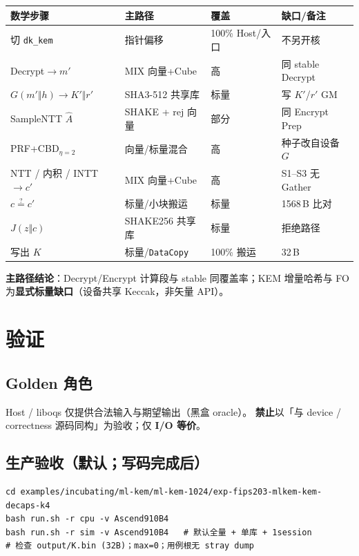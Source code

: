 \documentclass[UTF8,a4paper,11pt]{ctexart}
\begin{document}
\begin{longtable}{@{}L{3.8cm}L{3.6cm}L{1.4cm}L{4.0cm}@{}}
\toprule
数学步骤 & 主路径 & 覆盖 & 缺口/备注 \\
\midrule
切 \texttt{dk\_kem} & 指针偏移 & 100\% Host/入口 & 不另开核 \\
Decrypt$\to m'$ & MIX 向量+Cube & 高 & 同 stable Decrypt \\
$G(m'\Vert h)\to K'\Vert r'$ & SHA3-512 共享库 & 标量 & 写 $K'$/$r'$ GM \\
SampleNTT $\hat{A}$ & SHAKE + rej 向量 & 部分 & 同 Encrypt Prep \\
PRF+CBD$_{\eta=2}$ & 向量/标量混合 & 高 & 种子改自设备 $G$ \\
NTT / 内积 / INTT$\to c'$ & MIX 向量+Cube & 高 & S1--S3 无 Gather \\
$c\stackrel{?}{=}c'$ & 标量/小块搬运 & 标量 & 1568\,B 比对 \\
$J(z\Vert c)$ & SHAKE256 共享库 & 标量 & 拒绝路径 \\
写出 $K$ & 标量/\texttt{DataCopy} & 100\% 搬运 & 32\,B \\
\bottomrule
\end{longtable}

\textbf{主路径结论}：Decrypt/Encrypt 计算段与 stable 同覆盖率；KEM 增量哈希与 FO
为\textbf{显式标量缺口}（设备共享 Keccak，非矢量 API）。

\section{验证}
\label{sec:verify}

\subsection{Golden 角色}

Host / liboqs 仅提供合法输入与期望输出（黑盒 oracle）。
\textbf{禁止}以「与 device / correctness 源码同构」为验收；仅 \textbf{I/O 等价}。

\subsection{生产验收（默认；写码完成后）}

\begin{verbatim}
cd examples/incubating/ml-kem/ml-kem-1024/exp-fips203-mlkem-kem-decaps-k4
bash run.sh -r cpu -v Ascend910B4
bash run.sh -r sim -v Ascend910B4   # 默认全量 + 单库 + 1session
# 检查 output/K.bin (32B)；max=0；用例根无 stray dump
\end{verbatim}
\end{document}
